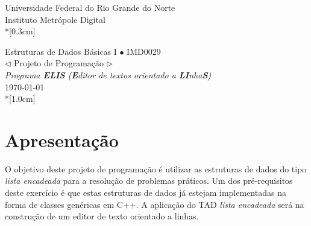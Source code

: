 \documentclass[11pt,a4paper]{article}
\begin{document}

\pagestyle{fancy}%
\renewcommand{\headrulewidth}{0.4pt}
\renewcommand{\footrulewidth}{0.4pt}
%
%




\newcommand{\code}[1]{\texttt{\colorbox{lightgrey}{#1}}}



\thispagestyle{empty}



\begin{center}
\Large\sc
Universidade Federal do Rio Grande do Norte\\
\large\sc
Instituto Metrópole Digital \\*[0.3cm]

\rm
\normalsize
Estruturas de Dados Básicas I $\bullet$ IMD0029\\
  $\lhd$ Projeto de Programação $\rhd$\\[0.2cm]
  {\it Programa \textbf{ELIS} ({\it \textbf{E}ditor de textos orientado a \textbf{LI}nha\textbf{S}})}\\[0.2cm]%
\today\\*[1.0cm]
\end{center}


\section*{Apresentação}
\label{sec:objetivos}

O objetivo deste projeto de programação é utilizar as estruturas de dados do
tipo \emph{lista encadeada} para a resolução de problemas práticos.
Um dos pré-requisitos deste exercício é que estas estruturas de dados já estejam
implementadas na forma de classes genéricas em C++.
%
A aplicação do TAD \emph{lista encadeada} será na construção de um editor de texto
orientado a linhas.

\tableofcontents
\end{document}
